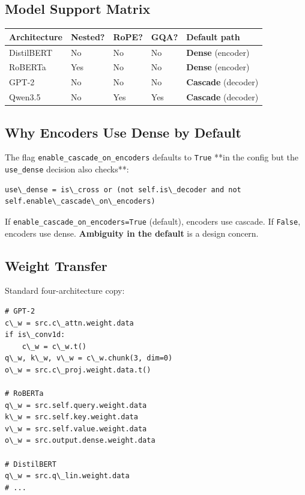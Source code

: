 \subsection{Model Support Matrix}

\begin{table}[H]
\centering
\small
\begin{tabular}{lllll}
\toprule
\textbf{Architecture} & \textbf{Nested?} & \textbf{RoPE?} & \textbf{GQA?} & \textbf{Default path} \\
\midrule
DistilBERT & No & No & No & \textbf{Dense} (encoder) \\
RoBERTa & Yes & No & No & \textbf{Dense} (encoder) \\
GPT-2 & No & No & No & \textbf{Cascade} (decoder) \\
Qwen3.5 & No & Yes & Yes & \textbf{Cascade} (decoder) \\
\bottomrule
\end{tabular}
\end{table}

\subsection{Why Encoders Use Dense by Default}

The flag \texttt{enable\_cascade\_on\_encoders} defaults to \texttt{True} **in the config 
but the \texttt{use\_dense} decision also checks**:

\begin{lstlisting}
use\_dense = is\_cross or (not self.is\_decoder and not self.enable\_cascade\_on\_encoders)
\end{lstlisting}

If \texttt{enable\_cascade\_on\_encoders=True} (default), encoders use cascade. If 
\texttt{False}, encoders use dense. \textbf{Ambiguity in the default} is a design 
concern.

\subsection{Weight Transfer}

Standard four-architecture copy:

\begin{lstlisting}
# GPT-2
c\_w = src.c\_attn.weight.data
if is\_conv1d:
    c\_w = c\_w.t()
q\_w, k\_w, v\_w = c\_w.chunk(3, dim=0)
o\_w = src.c\_proj.weight.data.t()

# RoBERTa
q\_w = src.self.query.weight.data
k\_w = src.self.key.weight.data
v\_w = src.self.value.weight.data
o\_w = src.output.dense.weight.data

# DistilBERT
q\_w = src.q\_lin.weight.data
# ...
\end{lstlisting}

